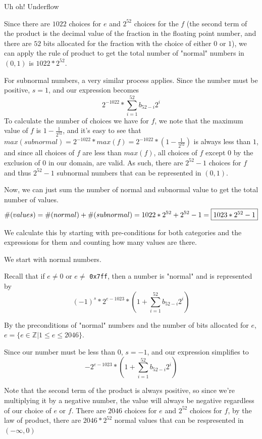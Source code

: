 \documentclass[11pt, nopagenumbers]{adamblan-hw}
\newcommand{\ZZ}{\mathbb{Z}}
\begin{document}
\begin{question}{Uh oh! Underflow}
\begin{part}
Since there are $1022$ choices for $e$ and $2^{52}$ choices for the $f$ (the second
term of the product is the decimal value of the fraction in the floating point number, and
there are $52$ bits allocated for the fraction with the choice of either $0$ or $1$), we
can apply the rule of product to get the total number of "normal" numbers in $(0, 1)$ is 
$1022 * 2^{52}$.

For subnormal numbers, a very similar process applies. Since the number must be positive, $s = 1$,
and our expression becomes $$2^{-1022} * \sum\limits_{i=1}^{52}{b_{52-i}2^i}$$ To calculate
the number of choices we have for $f$, we note that the maximum value of $f$ is $1 - \frac{1}{2^{52}}$, 
and it's easy to see that $max(subnormal) = 2^{-1022} * max(f) = 2^{-1022} * (1 - \frac{1}{2^{52}})$ is always less than $1$, 
and since all choices of $f$ are less than $max(f)$, all choices of $f$ except $0$ by the exclusion of $0$
in our domain, are valid. As such, there are $2^{52} - 1$ choices for $f$ and thus 
$2^{52} - 1$ subnormal numbers that can be represented in $(0, 1)$. 

Now, we can just sum the number of normal and subnormal value to get the total number of values.
$$\#(values) = \#(normal) + \#(subnormal) = 1022 * 2^{52} + 2^{52} - 1 = \fbox{$1023*2^{52} - 1$}$$
\end{part}

\pagebreak
\begin{part}
We calculate this by starting
with pre-conditions for both categories and the expressions for them and counting
how many values are there.

We start with normal numbers. 

Recall that if $e \neq 0$ or $e \neq$ \texttt{0x7ff}, then a number is "normal" and
is represented by $$(-1)^s * 2^{e-1023} * (1 + \sum\limits_{i=1}^{52}{b_{52-i}2^i})$$ 

By the preconditions of "normal" numbers and the
number of bits allocated for $e$, $e = \{e \in \ZZ | 1 \leq e \leq 2046\}$.

Since our number must be less than 0, $s=-1$, and our expression simplifies to 
$$-2^{e-1023} * (1 + \sum\limits_{i=1}^{52}{b_{52-i}2^i})$$ 

Note that the second term
of the product is always positive, so since we're multiplying it by a negative number,
the value will always be negative regardless of our choice of $e$ or $f$. There are 
$2046$ choices for $e$ and $2^{52}$ choices for $f$, by the law of product, there are $2046 * 2^{52}$ normal 
values that can be respresented in $(-\infty, 0)$


\end{part}
\end{question}
\end{document}

